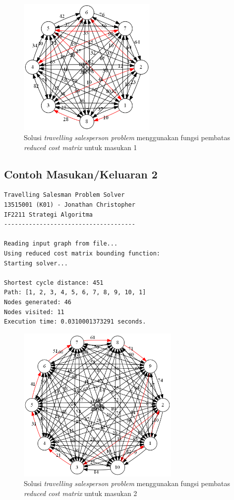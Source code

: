 \documentclass[a4paper,titlepage]{article}
\begin{document}
		\begin{figure}[H]
		    \centering
		    \includegraphics[width=0.6\textwidth]{1.png}
		    \caption{Solusi \textit{travelling salesperson problem} menggunakan fungsi pembatas \textit{reduced cost matrix} untuk masukan 1}
		    \label{fig:hasileksekusi1}
		\end{figure}

		\subsection{Contoh Masukan/Keluaran 2}

		

		\begin{lstlisting}
Travelling Salesman Problem Solver
13515001 (K01) - Jonathan Christopher
IF2211 Strategi Algoritma
-------------------------------------

Reading input graph from file...
Using reduced cost matrix bounding function:
Starting solver...

Shortest cycle distance: 451
Path: [1, 2, 3, 4, 5, 6, 7, 8, 9, 10, 1]
Nodes generated: 46
Nodes visited: 11
Execution time: 0.0310001373291 seconds.
		\end{lstlisting}

		\begin{figure}[H]
		    \centering
		    \includegraphics[width=0.7\textwidth]{2.png}
		    \caption{Solusi \textit{travelling salesperson problem} menggunakan fungsi pembatas \textit{reduced cost matrix} untuk masukan 2}
		    \label{fig:hasileksekusi2}
		\end{figure}
\end{document}
